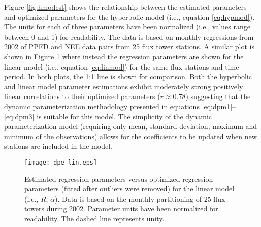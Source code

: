Figure \ref{fig:hmodest} shows the relationship between the estimated parameters and optimized parameters for the hyperbolic model (i.e., equation \ref{eq:hypmod}).  
The units for each of three parameters have been normalized (i.e., values range between 0 and 1) for readability.  
The data is based on monthly regressions from 2002 of PPFD and NEE data pairs from 25 flux tower stations.  
A similar plot is shown in Figure \ref{fig:lmodest} where instead the regression parameters are shown for the linear model (i.e., equation \ref{eq:linmod}) for the same flux stations and time period.  
In both plots, the 1:1 line is shown for comparison.  
Both the hyperbolic and linear model parameter estimations exhibit moderately strong positively linear correlations to their optimized parameters ($r \approx 0.78$) suggesting that the dynamic parameterization methodology presented in equations \ref{eq:dpm1}--\ref{eq:dpm3} is suitable for this model.  
The simplicity of the dynamic parameterization model (requiring only mean, standard deviation, maximum and minimum of the observations) allows for the coefficients to be updated when new stations are included in the model.

\begin{figure}[h!]
    \texttt{[image: dpe\_lin.eps]}
    \caption{Estimated regression parameters versus optimized regression 
    parameters (fitted after outliers were removed) for the linear model 
    (i.e., $R$, $\alpha$). Data is based on the monthly partitioning of 25 flux 
    towers during 2002. Parameter units have been normalized for readability. 
    The dashed line represents unity.}
    \label{fig:lmodest}
\end{figure}

